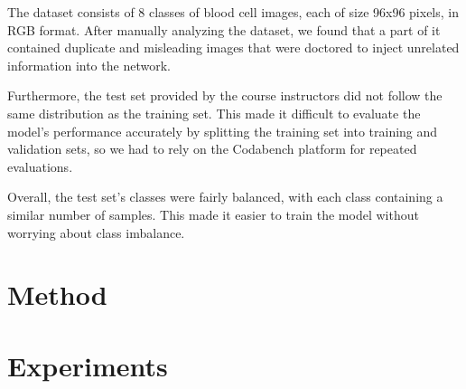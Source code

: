 \documentclass[11pt]{article}
\begin{document}
\begin{multicols}{2}

    The dataset consists of 8 classes of blood cell images, each of size 96x96
    pixels, in RGB format. After manually analyzing the dataset, we found that
    a part of it contained duplicate and misleading images that were doctored
    to inject unrelated information into the network.

    Furthermore, the test set provided by the course instructors did not follow
    the same distribution as the training set. This made it difficult to
    evaluate the model's performance accurately by splitting the training set
    into training and validation sets, so we had to rely on the Codabench
    platform for repeated evaluations.

    Overall, the test set's classes were fairly balanced, with each class
    containing a similar number of samples. This made it easier to train the
    model without worrying about class imbalance.

    \section{Method}



    \section{Experiments}


\end{multicols}
\end{document}
